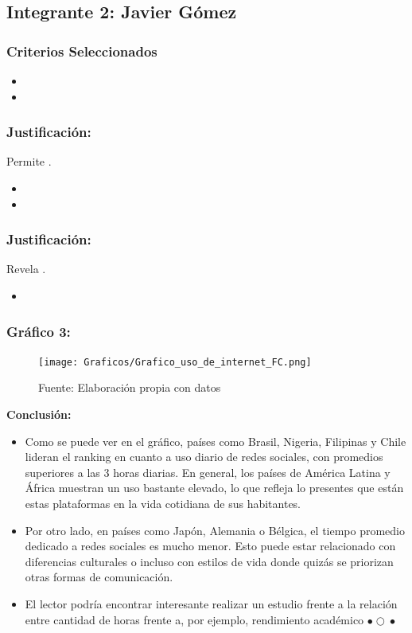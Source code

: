 \documentclass[12pt, a4paper]{article}
\begin{document}
\newpage
\subsection*{Integrante 2: Javier Gómez}

\subsubsection*{Criterios Seleccionados}
\begin{itemize}
    \item 
    \item 
\end{itemize}

\subsubsection*{Justificación: }
Permite .

\begin{itemize}
    \item 
    \item 
\end{itemize}

\subsubsection*{Justificación: }
Revela .
\begin{itemize}
    \item 
\end{itemize}

\subsubsection*{Gráfico 3: }
\begin{figure}[H]
    \centering
    \texttt{[image: Graficos/Grafico\_uso\_de\_internet\_FC.png]}
    \caption[3]{Fuente: Elaboración propia con datos}
\end{figure}

\newpage
\textbf{Conclusión:}  
\begin{itemize}
    \item Como se puede ver en el gráfico, países como Brasil, Nigeria, Filipinas y Chile lideran el ranking en cuanto a uso diario de redes sociales, con promedios superiores a las 3 horas diarias. En general, los países de América Latina y África muestran un uso bastante elevado, lo que refleja lo presentes que están estas plataformas en la vida cotidiana de sus habitantes.
    \item Por otro lado, en países como Japón, Alemania o Bélgica, el tiempo promedio dedicado a redes sociales es mucho menor. Esto puede estar relacionado con diferencias culturales o incluso con estilos de vida donde quizás se priorizan otras formas de comunicación.
    \item El lector podría encontrar interesante realizar un estudio frente a la relación entre cantidad de horas frente a, por ejemplo, rendimiento académico $\bullet{}\bigcirc{}\bullet{}$
\end{itemize}
\end{document}
